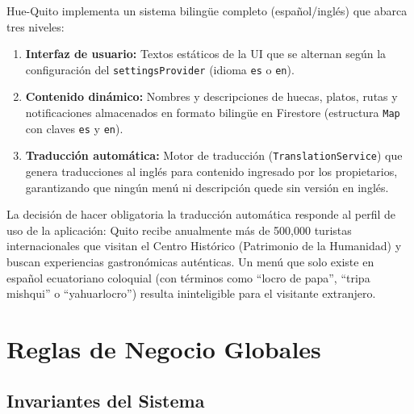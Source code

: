 \documentclass[11pt, a4paper, oneside]{report}
\begin{document}
Hue-Quito implementa un sistema bilingüe completo (español/inglés) que abarca tres niveles:

\begin{enumerate}
  \item \textbf{Interfaz de usuario:} Textos estáticos de la UI que se alternan según la configuración del \texttt{settingsProvider} (idioma \texttt{es} o \texttt{en}).
  \item \textbf{Contenido dinámico:} Nombres y descripciones de huecas, platos, rutas y notificaciones almacenados en formato bilingüe en Firestore (estructura \texttt{Map} con claves \texttt{es} y \texttt{en}).
  \item \textbf{Traducción automática:} Motor de traducción (\texttt{TranslationService}) que genera traducciones al inglés para contenido ingresado por los propietarios, garantizando que ningún menú ni descripción quede sin versión en inglés.
\end{enumerate}

\begin{decisionbox}
La decisión de hacer obligatoria la traducción automática responde al perfil de uso de la aplicación: Quito recibe anualmente más de 500,000 turistas internacionales que visitan el Centro Histórico (Patrimonio de la Humanidad) y buscan experiencias gastronómicas auténticas. Un menú que solo existe en español ecuatoriano coloquial (con términos como ``locro de papa'', ``tripa mishqui'' o ``yahuarlocro'') resulta ininteligible para el visitante extranjero.
\end{decisionbox}

\chapter{Reglas de Negocio Globales}

\section{Invariantes del Sistema}
\end{document}
